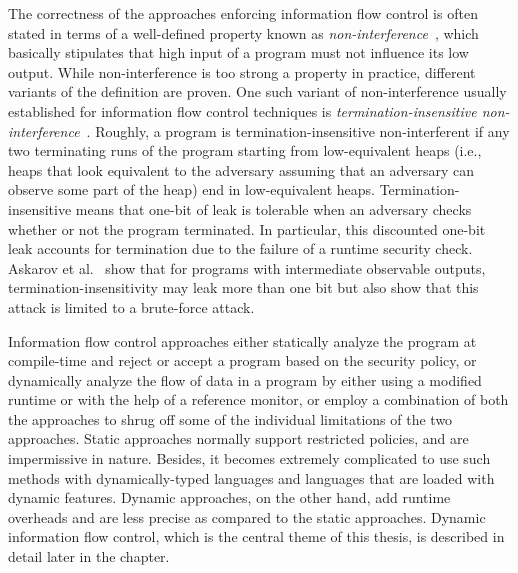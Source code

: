 The correctness of the approaches enforcing information flow control
is often stated in terms of a well-defined property known 
as \emph{non-interference}~\cite{goguen}, which basically stipulates
that high input of a program must not influence its low output. While
non-interference is too strong a property in practice, different
variants of the definition are proven. One such variant of
non-interference usually established for information flow control
techniques is \emph{termination-insensitive
  non-interference}~\cite{volpano}. Roughly, a program is
termination-insensitive non-interferent if any two terminating runs 
of the program starting from low-equivalent heaps (i.e., heaps that
look equivalent to the adversary assuming that an adversary can
observe some part of the heap) end in low-equivalent
heaps. Termination-insensitive means that one-bit of leak is tolerable
when an adversary checks whether or not the program terminated. In
particular, this discounted one-bit leak accounts for termination due
to the failure of a runtime security  check. Askarov et
al.~\cite{askarov} show that for programs with intermediate observable
outputs, termination-insensitivity may leak more than one bit but also
show that this attack is limited to a brute-force attack. 

Information flow control approaches either statically analyze the
program at compile-time and reject or accept a program based on the
security policy, or dynamically analyze the flow of data in a program
by either using a modified runtime or with the help of a reference
monitor, or employ a combination of both the approaches to shrug off 
some of the individual limitations of the two approaches. Static approaches
normally support restricted policies, and are impermissive in
nature. Besides, it becomes extremely complicated to use such methods
with dynamically-typed languages and languages that are loaded with
dynamic features. Dynamic approaches, on the other hand, add runtime
overheads and are less precise as compared to the static
approaches. Dynamic information flow control, which is the central
theme of this thesis, is described in detail later in the
chapter. 

